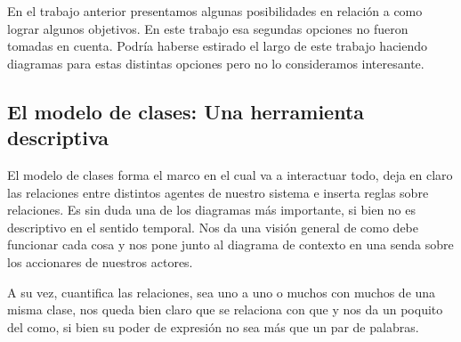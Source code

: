 En el trabajo anterior presentamos algunas posibilidades en relación a como lograr algunos objetivos. En este trabajo esa segundas opciones no fueron tomadas en cuenta. Podría haberse estirado el largo de este trabajo haciendo diagramas para estas distintas opciones pero no lo consideramos interesante. 

\subsection{El modelo de clases: Una herramienta descriptiva}

El modelo de clases forma el marco en el cual va a interactuar todo, deja en claro las relaciones entre distintos agentes de nuestro sistema e inserta reglas sobre relaciones. Es sin duda una de los diagramas más importante, si bien no es descriptivo en el sentido temporal. Nos da una visión general de como debe funcionar cada cosa y nos pone junto al diagrama de contexto en una senda sobre los accionares de nuestros actores. 

A su vez, cuantifica las relaciones, sea uno a uno o muchos con muchos de una misma clase, nos queda bien claro que se relaciona con que y nos da un poquito del como, si bien su poder de expresión no sea más que un par de palabras.

